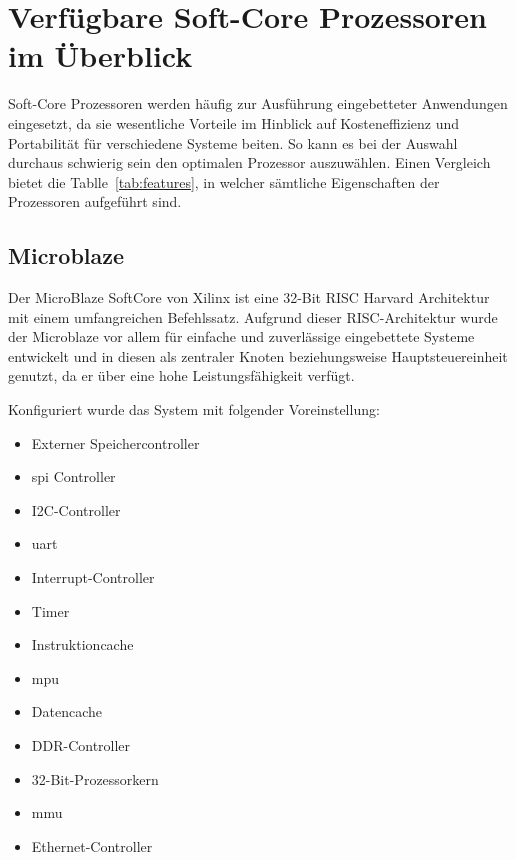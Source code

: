 \section{Verfügbare Soft-Core Prozessoren im Überblick}\label{kap:überblick}
Soft-Core Prozessoren werden häufig zur Ausführung eingebetteter Anwendungen eingesetzt, da sie wesentliche Vorteile im Hinblick auf Kosteneffizienz und Portabilität für verschiedene Systeme
beiten. So kann es bei der Auswahl durchaus schwierig sein den optimalen Prozessor auszuwählen. Einen Vergleich bietet die Tablle~\ref{tab:features}, in welcher sämtliche Eigenschaften
der Prozessoren aufgeführt sind.\\

\subsection{Microblaze}\label{kap:microblaze}


Der MicroBlaze SoftCore von Xilinx ist eine 32-Bit RISC Harvard Architektur mit einem umfangreichen Befehlssatz. Aufgrund dieser RISC-Architektur
 wurde der Microblaze vor allem für einfache und zuverlässige eingebettete Systeme entwickelt und in diesen als zentraler Knoten beziehungsweise Hauptsteuereinheit
genutzt, da er über eine hohe Leistungsfähigkeit verfügt.

Konfiguriert wurde das System mit folgender Voreinstellung:~\cite{microblaze}\\
        \begin{itemize}
          \item Externer Speichercontroller
          \item \ac{spi} Controller
          \item I2C-Controller
          \item \ac{uart}
          \item Interrupt-Controller
          \item  Timer
          \item Instruktioncache
          \item \ac{mpu}
          \item Datencache
          \item DDR-Controller
          \item 32-Bit-Prozessorkern
          \item \ac{mmu}
          \item Ethernet-Controller
        \end{itemize}


